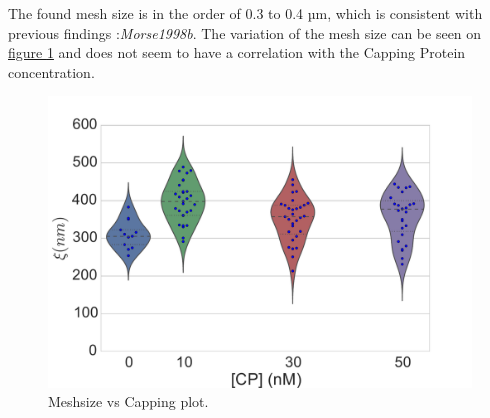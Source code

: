 \documentclass[A4paperpaper,11pt,english]{sphinxmanual}
\begin{document}
The found mesh size is in the order of 0.3 to 0.4 µm, which is consistent with previous findings
:\emph{Morse1998b}. The variation of the
mesh size can be seen on \hyperref[index-latex:xi-violin]{figure  \ref*{index-latex:xi-violin}} and does not seem to have a
correlation with the Capping Protein concentration.
\begin{figure}[htbp]
\centering
\capstart

\includegraphics[width=0.800\linewidth]{xi_violin.pdf}
\caption{Meshsize vs Capping plot.}\label{index-latex:xi-violin}\end{figure}
\end{document}
